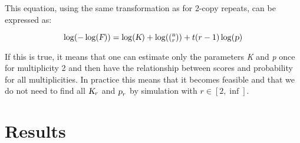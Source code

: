 \documentclass{ws-procs9x6}
\begin{document}
This equation, using the same transformation as for 2-copy repeats, can be expressed as:

\begin{equation}
\log(-\log(\textsl{F}))= \log(\textsl{K})+\log((_{r}^\textsl{n}))+t(r-1)\log(\textsl{p})
\end{equation}

If this is true, it means that one can estimate only the parameters \textsl{K} and \textsl{p} once
for multiplicity 2 and then have the relationship between scores and probability for all
multiplicities. In practice this means that it becomes feasible and that we do not need to
find all $\textsl{K}_{r}$ and $\textsl{p}_{r}$ by simulation with $r \in [2,\inf]$.

\section{Results}


%
%
\end{document}
